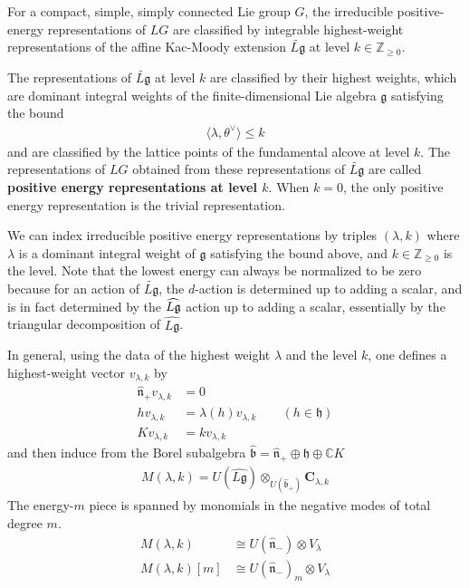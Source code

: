 \documentclass[12pt]{article}
\begin{document}
\begin{theorem}
For a compact, simple, simply connected Lie group $G$, the irreducible positive-energy representations of $LG$
are classified by integrable highest-weight representations of the affine Kac-Moody extension $\widetilde{L\mathfrak g}$ at level $k\in \mathbb Z_{\ge 0}$.
\end{theorem}

The representations of $\widetilde{L\mathfrak g}$ at level $k$ are classified by their highest weights, which are dominant integral weights of the finite-dimensional Lie algebra $\mathfrak g$ satisfying the bound \begin{align*}
    \langle \lambda,\theta^\vee\rangle \le k
\end{align*} and are classified by the lattice points of the fundamental alcove at level $k$. The representations of $LG$ obtained from these representations of $\widetilde{L\mathfrak g}$ are called \textbf{positive energy representations at level $k$}. When $k=0$, the only positive energy representation is the trivial representation. 

We can index irreducible positive energy representations by triples $(\lambda,k)$ where $\lambda$ is a dominant integral weight of $\mathfrak g$ satisfying the bound above, and $k\in \mathbb Z_{\ge 0}$ is the level. Note that the lowest energy can always be normalized to be zero because for an action of $\widetilde{L\mathfrak g}$, the $d$-action is determined up to adding a scalar, and is in fact determined by the $\widehat{L\mathfrak{g}}$ action up to adding a scalar, essentially by the triangular decomposition of $\widehat{L\mathfrak g}$.

In general, using the data of the highest weight $\lambda$ and the level $k$, one defines a highest-weight vector $v_{\lambda,k}$ by
\begin{align*}
    \widehat{\mathfrak n}_+v_{\lambda,k}&=0 \\
hv_{\lambda,k}&=\lambda(h)v_{\lambda,k}\qquad (h\in \mathfrak h) \\
Kv_{\lambda,k}&=kv_{\lambda,k}
\end{align*} and then induce from the Borel subalgebra $\widehat{\mathfrak b} = \widehat{\mathfrak n}_+ \oplus \mathfrak h \oplus \mathbb C K$ \begin{align*}
    M(\lambda,k)
=
U(\widehat{L\mathfrak g})\otimes_{U(\widehat{\mathfrak b}_+)} \mathbf C_{\lambda,k}
\end{align*} The energy-$m$ piece is spanned by monomials in the negative modes of total degree $m$. 
\begin{align*}
    M(\lambda,k)&\cong U(\widehat{\mathfrak n}_-)\otimes V_\lambda \\
M(\lambda,k)[m]&\cong U(\widehat{\mathfrak n}_-)_{m}\otimes V_\lambda
\end{align*}
\end{document}
